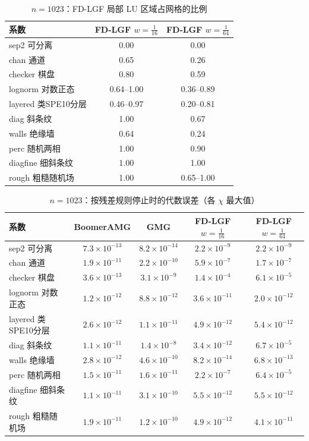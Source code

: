 \begin{table}[H]\centering\small
\caption{$n=1023$：FD-LGF 局部 LU 区域占网格的比例}\label{tab:loc}
\begin{tabular}{lcc}
\toprule
系数 & FD-LGF $w{=}\frac1{16}$ & FD-LGF $w{=}\frac1{64}$ \\
\midrule
sep2 可分离 & 0.00 & 0.00 \\
chan 通道 & 0.65 & 0.26 \\
checker 棋盘 & 0.80 & 0.59 \\
lognorm 对数正态 & 0.64--1.00 & 0.36--0.89 \\
layered 类SPE10分层 & 0.46--0.97 & 0.20--0.81 \\
diag 斜条纹 & 1.00 & 0.67 \\
walls 绝缘墙 & 0.64 & 0.24 \\
perc 随机两相 & 1.00 & 0.90 \\
diagfine 细斜条纹 & 1.00 & 1.00 \\
rough 粗糙随机场 & 1.00 & 0.65--1.00 \\
\bottomrule
\end{tabular}
\end{table}

\begin{table}[H]\centering\small
\caption{$n=1023$：按残差规则停止时的代数误差（各 $\chi$ 最大值）}\label{tab:err}
\begin{tabular}{lcccc}
\toprule
系数 & BoomerAMG & GMG & FD-LGF $w{=}\frac1{16}$ & FD-LGF $w{=}\frac1{64}$ \\
\midrule
sep2 可分离 & $7.3{\times}10^{-13}$ & $8.2{\times}10^{-14}$ & $2.2{\times}10^{-9}$ & $2.2{\times}10^{-9}$ \\
chan 通道 & $1.9{\times}10^{-11}$ & $2.2{\times}10^{-10}$ & $5.9{\times}10^{-7}$ & $1.7{\times}10^{-7}$ \\
checker 棋盘 & $3.6{\times}10^{-13}$ & $3.1{\times}10^{-9}$ & $1.4{\times}10^{-4}$ & $6.1{\times}10^{-5}$ \\
lognorm 对数正态 & $1.2{\times}10^{-12}$ & $8.8{\times}10^{-12}$ & $3.6{\times}10^{-11}$ & $2.0{\times}10^{-12}$ \\
layered 类SPE10分层 & $2.6{\times}10^{-12}$ & $1.1{\times}10^{-11}$ & $4.9{\times}10^{-12}$ & $5.4{\times}10^{-12}$ \\
diag 斜条纹 & $1.1{\times}10^{-11}$ & $1.4{\times}10^{-8}$ & $3.4{\times}10^{-12}$ & $6.7{\times}10^{-5}$ \\
walls 绝缘墙 & $2.8{\times}10^{-12}$ & $4.6{\times}10^{-10}$ & $8.2{\times}10^{-14}$ & $6.8{\times}10^{-13}$ \\
perc 随机两相 & $1.5{\times}10^{-11}$ & $1.6{\times}10^{-11}$ & $2.2{\times}10^{-7}$ & $6.4{\times}10^{-5}$ \\
diagfine 细斜条纹 & $1.1{\times}10^{-11}$ & $3.1{\times}10^{-10}$ & $5.5{\times}10^{-12}$ & $5.5{\times}10^{-12}$ \\
rough 粗糙随机场 & $1.9{\times}10^{-11}$ & $1.2{\times}10^{-10}$ & $4.9{\times}10^{-12}$ & $4.1{\times}10^{-11}$ \\
\bottomrule
\end{tabular}
\end{table}